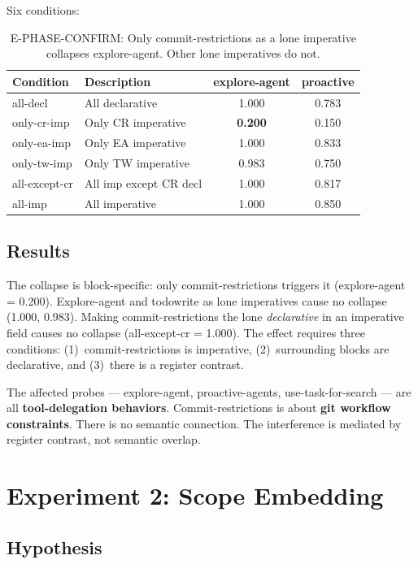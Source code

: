 \documentclass[11pt,a4paper]{article}
\begin{document}
Six conditions:

\begin{table}[H]
\centering
\small
\begin{tabular}{llcc}
\toprule
Condition & Description & explore-agent & proactive \\
\midrule
all-decl & All declarative & 1.000 & 0.783 \\
only-cr-imp & Only CR imperative & \textbf{0.200} & 0.150 \\
only-ea-imp & Only EA imperative & 1.000 & 0.833 \\
only-tw-imp & Only TW imperative & 0.983 & 0.750 \\
all-except-cr & All imp except CR decl & 1.000 & 0.817 \\
all-imp & All imperative & 1.000 & 0.850 \\
\bottomrule
\end{tabular}
\caption{E-PHASE-CONFIRM: Only commit-restrictions as a lone imperative
collapses explore-agent. Other lone imperatives do not.}
\label{tab:bomb}
\end{table}

\subsection{Results}

The collapse is block-specific: only commit-restrictions triggers it
(explore-agent = 0.200). Explore-agent and todowrite as lone
imperatives cause no collapse (1.000, 0.983). Making commit-restrictions
the lone \emph{declarative} in an imperative field causes no collapse
(all-except-cr = 1.000). The effect requires three conditions:
(1)~commit-restrictions is imperative, (2)~surrounding blocks are
declarative, and (3)~there is a register contrast.

The affected probes --- explore-agent, proactive-agents,
use-task-for-search --- are all \textbf{tool-delegation behaviors}.
Commit-restrictions is about \textbf{git workflow constraints}. There
is no semantic connection. The interference is mediated by register
contrast, not semantic overlap.

\section{Experiment 2: Scope Embedding}
\label{sec:scope}

\subsection{Hypothesis}
\end{document}
